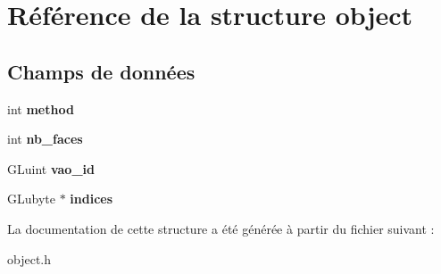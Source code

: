 \hypertarget{structobject}{\section{Référence de la structure object}
\label{structobject}
}
\subsection*{Champs de données}
\begin{DoxyCompactItemize}
\item 
\hypertarget{structobject_adcc9a19ad3119f823a658f6a49a24e64}{int {\bfseries method}}\label{structobject_adcc9a19ad3119f823a658f6a49a24e64}

\item 
\hypertarget{structobject_abf159625f65beb62a2c71c35069304e6}{int {\bfseries nb\-\_\-faces}}\label{structobject_abf159625f65beb62a2c71c35069304e6}

\item 
\hypertarget{structobject_ac97430dc005f065ac234be1f8ad0dcad}{G\-Luint {\bfseries vao\-\_\-id}}\label{structobject_ac97430dc005f065ac234be1f8ad0dcad}

\item 
\hypertarget{structobject_a8a89103d8852f3e3c8f15eed6208fc70}{G\-Lubyte $\ast$ {\bfseries indices}}\label{structobject_a8a89103d8852f3e3c8f15eed6208fc70}

\end{DoxyCompactItemize}


La documentation de cette structure a été générée à partir du fichier suivant \-:\begin{DoxyCompactItemize}
\item 
object.\-h\end{DoxyCompactItemize}

